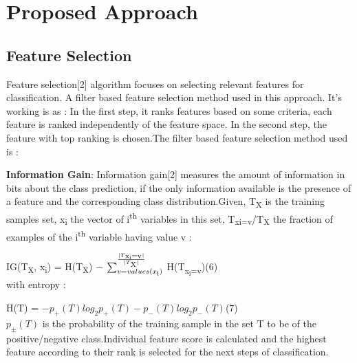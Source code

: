 \documentclass[a4paper, 10pt, conference]{ieeeconf}      %
\begin{document}
\section{Proposed Approach}

\subsection{Feature Selection}
\par 
Feature selection[2] algorithm focuses on selecting relevant features for classification. A filter based feature selection method used in this approach. It's working is as : In the first step, it ranks features based on some criteria, each feature is ranked independently of the feature space. In the second step, the feature with top ranking is chosen.The filter based feature selection method used is :
\par
\textbf{Information Gain}: Information gain[2] measures the amount of information in bits about the class prediction, if the only information available is the presence of a feature and the corresponding class distribution.Given, T\textsubscript{X} is the training samples set, x\textsubscript{i} the vector of i\textsuperscript{th} variables in this set, T\textsubscript{xi=v}/T\textsubscript{X} the fraction of examples of the i\textsuperscript{th} variable having value v : 
\newline

\hspace{1cm}IG(T\textsubscript{X}, x\textsubscript{i}) = H(T\textsubscript{X}) − $  \sum_{v=values(x\textsubscript{i})}^\frac{|T\textsubscript{x\textsubscript{i}=v}|}{|T\textsubscript{X}|}$ H(T\textsubscript{x\textsubscript{i}=v})\hspace{0.5cm}(6)\\ 
with entropy :
\newline
\par
\hspace{1cm}H(T) = $−p_{+}(T) log_{2} p_{+}(T) − p_{−}(T) log_{2} p_{−}(T)$\hspace{1.25cm}(7)\\
\newline
$p_{±}(T)$ is the probability of the training sample in the set T to be of the positive/negative class.Individual feature score is calculated and the highest feature according to their rank is selected for the next steps of classification.
\end{document}
